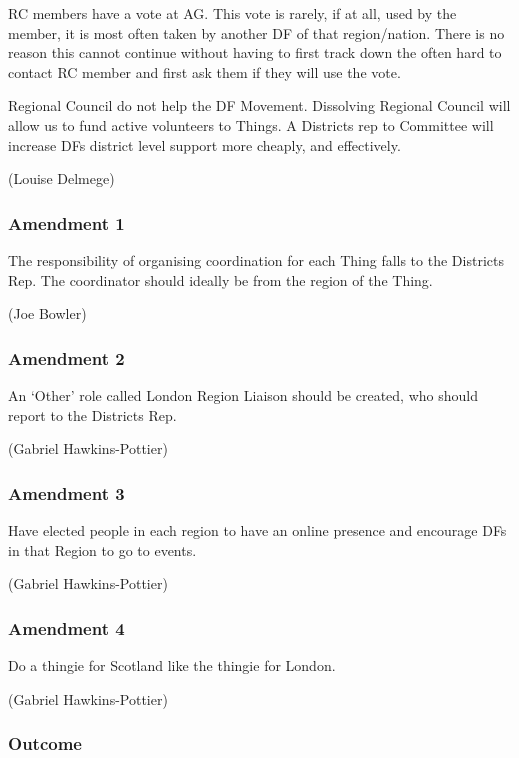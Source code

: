 \documentclass[a4paper, 11pt]{article} %
\begin{document}
RC members have a vote at AG.  This vote is rarely, if at all, used by the member, it is most often taken by another DF of that region/nation.  There is no reason this cannot continue without having to first track down the often hard to contact RC member and first ask them if they will use the vote.

Regional Council do not help the DF Movement.  Dissolving Regional Council will allow us to fund active volunteers to Things.  A Districts rep to Committee will increase DFs district level support more cheaply, and effectively.

(Louise Delmege)

\subsubsection{Amendment 1}

The responsibility of organising coordination for each Thing falls to the Districts Rep.  The coordinator should ideally be from the region of the Thing.

(Joe Bowler)

\subsubsection{Amendment 2}

An `Other' role called London Region Liaison should be created, who should report to the Districts Rep.

(Gabriel Hawkins-Pottier)

\subsubsection{Amendment 3}

Have elected people in each region to have an online presence and encourage DFs in that Region to go to events.

(Gabriel Hawkins-Pottier)

\subsubsection{Amendment 4}

Do a thingie for Scotland like the thingie for London.

(Gabriel Hawkins-Pottier)

\subsubsection{Outcome}
\end{document}
